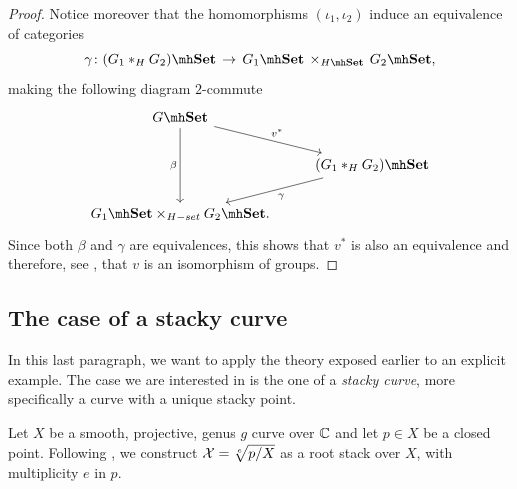 \begin{proof}
Notice moreover that the homomorphisms $(\iota_1, \iota_2)$ induce an equivalence of categories
\[
\gamma \colon (G_1 *_H G_2)\mh\Set \, \to \, G_1\mh\Set \, \times_{H\mh\Set} \,G_2\mh\Set,
\]
making the following diagram $2$-commute
\[\begin{tikzcd}
	{G\mh\Set} \\
	& {(G_1 *_H G_2)\mh\Set} \\
	{G_1\mh\Set \times_{H-set} G_2\mh\Set.}
	\arrow["{v^*}", from=1-1, to=2-2]
	\arrow["\beta"', from=1-1, to=3-1]
	\arrow["\gamma", from=2-2, to=3-1]
\end{tikzcd}\]
Since both $\beta$ and $\gamma$ are equivalences, this shows that $v^*$ is also an equivalence and therefore, see \cite[Proposition 4.7.1]{Douady2020}, that $v$ is an isomorphism of groups.
\end{proof}

\subsection{The case of a stacky curve}\label{stacky curve}
In this last paragraph, we want to apply the theory exposed earlier to an explicit example. The case we are interested in is the one of a \textit{stacky curve}, more specifically a curve with a unique stacky point.

Let $X$ be a smooth, projective, genus $g$ curve over $\mathbb{C}$ and let $p \in X$ be a closed point. Following \cite[]{Cadman}, we construct $\mathcal{X} = \sqrt[e]{p/X} $ as a root stack over $X$, with multiplicity $e$ in $p$.

